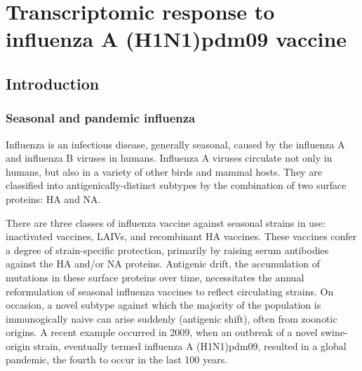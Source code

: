 %
%

\chapter{Transcriptomic response to influenza A (H1N1)pdm09 vaccine}
\label{ch:hird_DGE}

\section{Introduction}

\subsection{Seasonal and pandemic influenza}

Influenza is an infectious disease, generally seasonal, caused by the influenza A and influenza B viruses in humans.
Influenza A viruses circulate not only in humans, but also in a variety of other birds and mammal hosts.
They are classified into antigenically-distinct subtypes by the combination of two surface proteins: \gls{HA} and \gls{NA}\autocite{krammer2018Influenza}.

There are three classes of influenza vaccine against seasonal strains in use: inactivated vaccines, \glspl{LAIV}, and recombinant \gls{HA} vaccines.
These vaccines confer a degree of strain-specific protection, primarily by raising serum antibodies against the \gls{HA} and/or \gls{NA} proteins.
Antigenic drift, the accumulation of mutations in these surface proteins over time, necessitates the annual reformulation of seasonal influenza vaccines to reflect circulating strains\autocite{houser2015InfluenzaVaccinesChallenges, sautto2018UniversalInfluenzaVaccine}.
On occasion, a novel subtype against which the majority of the population is immunogically naive can arise suddenly (antigenic shift), often from zoonotic origins.
A recent example occurred in 2009, when an outbreak of a novel swine-origin strain, eventually termed influenza A (H1N1)pdm09, resulted in a global pandemic, the fourth to occur in the last 100 years\autocite{krammer2018Influenza}.
%

